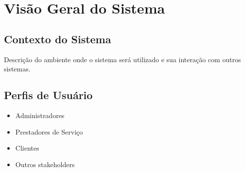 \section{Visão Geral do Sistema}
\subsection{Contexto do Sistema}
Descrição do ambiente onde o sistema será utilizado e sua interação com outros sistemas.

\subsection{Perfis de Usuário}
\begin{itemize}
    \item Administradores
    \item Prestadores de Serviço
    \item Clientes
    \item Outros stakeholders
\end{itemize} 